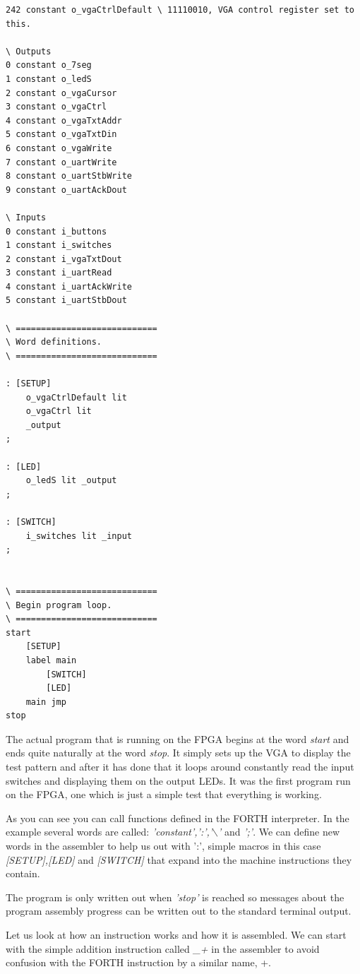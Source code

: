 \documentclass	[a4paper, 10pt]	{article}
\begin{document}
\begin{verbatim}
242 constant o_vgaCtrlDefault \ 11110010, VGA control register set to this.

\ Outputs
0 constant o_7seg
1 constant o_ledS
2 constant o_vgaCursor
3 constant o_vgaCtrl
4 constant o_vgaTxtAddr
5 constant o_vgaTxtDin
6 constant o_vgaWrite
7 constant o_uartWrite
8 constant o_uartStbWrite
9 constant o_uartAckDout

\ Inputs
0 constant i_buttons
1 constant i_switches
2 constant i_vgaTxtDout
3 constant i_uartRead
4 constant i_uartAckWrite
5 constant i_uartStbDout

\ ============================
\ Word definitions.
\ ============================

: [SETUP]
    o_vgaCtrlDefault lit
    o_vgaCtrl lit 
    _output
;

: [LED]
    o_ledS lit _output
;

: [SWITCH]
    i_switches lit _input
;


\ ============================
\ Begin program loop.
\ ============================
start
    [SETUP]
    label main
        [SWITCH]
        [LED]
    main jmp
stop
\end{verbatim}

    The actual program that is running on the FPGA begins at the word \emph{start}
    and ends quite naturally at the word \emph{stop}. It simply sets up the VGA
    to display the test pattern and after it has done that it loops around
    constantly read the input switches and displaying them on the output LEDs. It
    was the first program run on the FPGA, one which is just a simple test that
    everything is working.

    As you can see you can call functions defined in the FORTH interpreter. In the
    example several words are called: \emph{'constant',':','$\backslash$'} and \emph{';'}. We can
    define new words in the assembler to help us out with ':', simple macros in
    this case \emph{[SETUP],[LED]} and \emph{[SWITCH]} that expand into the machine
    instructions they contain.

    The program is only written out when \emph{'stop'} is reached so messages
    about the program assembly progress can be written out to the standard terminal
    output.

    Let us look at how an instruction works and how it is assembled. We can start
    with the simple addition instruction called \emph{\_+} in the assembler to
    avoid confusion with the FORTH instruction by a similar name, +. 
\end{document}
